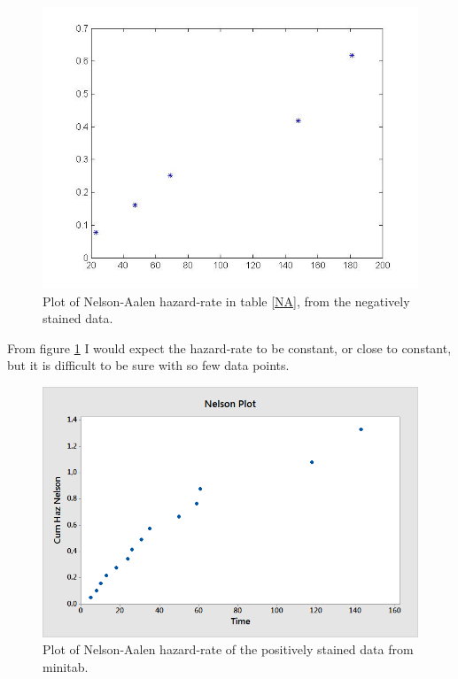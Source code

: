 \documentclass[10pt, a4paper]{article}
\begin{document}
\begin{center}
\begin{figure}[h!]
\centering
\includegraphics[scale=0.50]{NA}
\caption{Plot of Nelson-Aalen hazard-rate in table \ref{NA}, from the negatively stained data.  }
\label{NAh}
\end{figure}
\end{center}
From figure \ref{NAh} I would expect the hazard-rate to be constant, or close to constant, but it is difficult to be sure with so few data points.

\begin{center}
\begin{figure}[h!]
\centering
\includegraphics[scale=0.75]{nelson2.png}
\caption{Plot of Nelson-Aalen hazard-rate of the positively stained data from minitab.  }
\label{NAm}
\end{figure}
\end{center}
\end{document}
